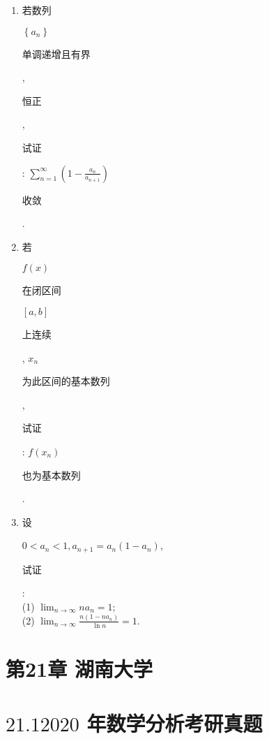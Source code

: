 \documentclass[10pt]{article}
\begin{document}
\begin{enumerate}
  \item \begin{CJK}{UTF8}{mj}若数列\end{CJK} $\left\{a_{n}\right\}$ \begin{CJK}{UTF8}{mj}单调递增且有界\end{CJK}, \begin{CJK}{UTF8}{mj}恒正\end{CJK}, \begin{CJK}{UTF8}{mj}试证\end{CJK}: $\sum_{n=1}^{\infty}\left(1-\frac{a_{n}}{a_{n+1}}\right)$ \begin{CJK}{UTF8}{mj}收敛\end{CJK}.

  \item \begin{CJK}{UTF8}{mj}若\end{CJK} $f(x)$ \begin{CJK}{UTF8}{mj}在闭区间\end{CJK} $[a, b]$ \begin{CJK}{UTF8}{mj}上连续\end{CJK}, $x_{n}$ \begin{CJK}{UTF8}{mj}为此区间的基本数列\end{CJK}, \begin{CJK}{UTF8}{mj}试证\end{CJK}: $f\left(x_{n}\right)$ \begin{CJK}{UTF8}{mj}也为基本数列\end{CJK}.

  \item \begin{CJK}{UTF8}{mj}设\end{CJK} $0<a_{n}<1, a_{n+1}=a_{n}\left(1-a_{n}\right)$, \begin{CJK}{UTF8}{mj}试证\end{CJK}:\\
(1) $\lim _{n \rightarrow \infty} n a_{n}=1$;\\
(2) $\lim _{n \rightarrow \infty} \frac{n\left(1-n a_{n}\right)}{\ln n}=1$.

\end{enumerate}
\section{第21章 湖南大学}
\section{$21.12020$ 年数学分析考研真题}
\end{document}
